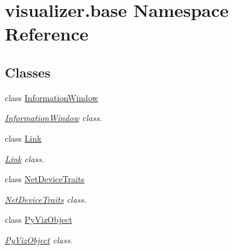 \hypertarget{namespacevisualizer_1_1base}{}\section{visualizer.\+base Namespace Reference}
\label{namespacevisualizer_1_1base}
\subsection*{Classes}
\begin{DoxyCompactItemize}
\item 
class \hyperlink{classvisualizer_1_1base_1_1InformationWindow}{Information\+Window}
\begin{DoxyCompactList}\small\item\em \hyperlink{classvisualizer_1_1base_1_1InformationWindow}{Information\+Window} class. \end{DoxyCompactList}\item 
class \hyperlink{classvisualizer_1_1base_1_1Link}{Link}
\begin{DoxyCompactList}\small\item\em \hyperlink{classvisualizer_1_1base_1_1Link}{Link} class. \end{DoxyCompactList}\item 
class \hyperlink{classvisualizer_1_1base_1_1NetDeviceTraits}{Net\+Device\+Traits}
\begin{DoxyCompactList}\small\item\em \hyperlink{classvisualizer_1_1base_1_1NetDeviceTraits}{Net\+Device\+Traits} class. \end{DoxyCompactList}\item 
class \hyperlink{classvisualizer_1_1base_1_1PyVizObject}{Py\+Viz\+Object}
\begin{DoxyCompactList}\small\item\em \hyperlink{classvisualizer_1_1base_1_1PyVizObject}{Py\+Viz\+Object} class. \end{DoxyCompactList}\end{DoxyCompactItemize}
